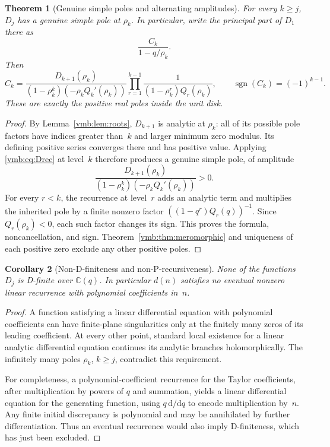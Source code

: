 \documentclass[11pt,a4paper]{article}
\numberwithin{equation}{section}
\newtheorem{theorem}{Theorem}[section]
\newtheorem{corollary}[theorem]{Corollary}
\theoremstyle{definition}\newtheorem{definition}[theorem]{Definition}
\theoremstyle{remark}\newtheorem{remark}[theorem]{Remark}
\newcommand{\C}{\mathbb C}
\newcommand{\dd}{\mathrm d}
\begin{document}
\begin{theorem}[Genuine simple poles and alternating amplitudes]
\label{vmb:thm:ladder}
For every \(k\geq j\), \(D_j\) has a genuine simple pole at
\(\rho_k\). In particular, write the principal part of \(D_1\) there
as
\[
\frac{C_k}{1-q/\rho_k}.
\]
Then
\begin{equation}\label{vmb:eq:Ck}
C_k=
\frac{D_{k+1}(\rho_k)}{(1-\rho_k^k)(-\rho_k Q_k'(\rho_k))}
\prod_{r=1}^{k-1}\frac{1}{(1-\rho_k^r)Q_r(\rho_k)},
\qquad \operatorname{sgn}(C_k)=(-1)^{k-1}.
\end{equation}
These are exactly the positive real poles inside the unit disk.
\end{theorem}
\begin{proof}
By Lemma~\ref{vmb:lem:roots}, \(D_{k+1}\) is analytic at \(\rho_k\):
all of its possible pole factors have indices greater than~\(k\) and
larger minimum zero modulus. Its defining positive series converges
there and has positive value. Applying \eqref{vmb:eq:Drec} at level~\(k\)
therefore produces a genuine simple pole, of amplitude
\[
\frac{D_{k+1}(\rho_k)}{(1-\rho_k^k)(-\rho_k Q_k'(\rho_k))}>0.
\]
For every \(r<k\), the recurrence at level~\(r\) adds an analytic
term and multiplies the inherited pole by a finite nonzero factor
\(((1-q^r)Q_r(q))^{-1}\). Since \(Q_r(\rho_k)<0\), each such factor
changes its sign. This proves the formula, noncancellation, and sign.
Theorem~\ref{vmb:thm:meromorphic} and uniqueness of each positive zero
exclude any other positive poles.
\end{proof}

\begin{corollary}[Non-D-finiteness and non-P-recursiveness]
\label{vmb:cor:nonD}
None of the functions \(D_j\) is D-finite over \(\C(q)\). In
particular \(d(n)\) satisfies no eventual nonzero linear recurrence
with polynomial coefficients in~\(n\).
\end{corollary}
\begin{proof}
A function satisfying a linear differential equation with polynomial
coefficients can have finite-plane singularities only at the finitely
many zeros of its leading coefficient. At every other point, standard
local existence for a linear analytic differential equation continues
its analytic branches holomorphically. The infinitely many poles
\(\rho_k\), \(k\geq j\), contradict this requirement.

For completeness, a polynomial-coefficient recurrence for the Taylor
coefficients, after multiplication by powers of \(q\) and summation,
yields a linear differential equation for the generating function, using
\(q\,\dd/\dd q\) to encode multiplication by~\(n\). Any finite
initial discrepancy is polynomial and may be annihilated by further
differentiation. Thus an eventual recurrence would also imply
D-finiteness, which has just been excluded.
\end{proof}
\end{document}
